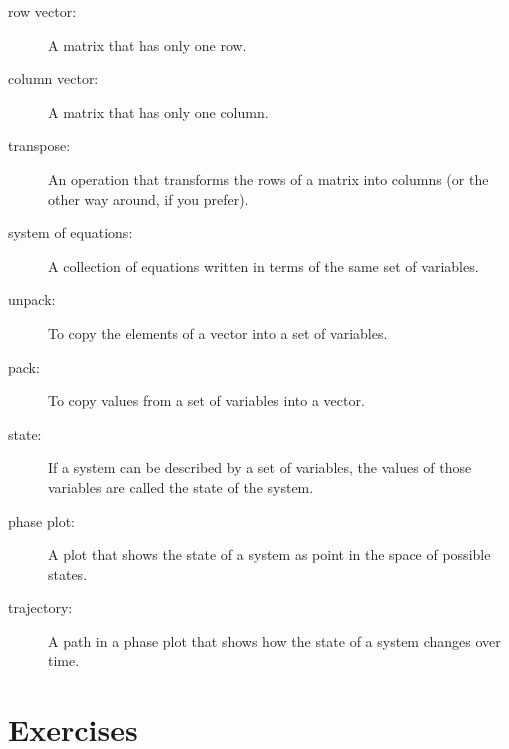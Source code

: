 \begin{description}

\item[row vector:] A matrix that has only one row.

\item[column vector:] A matrix that has only one column.

\item[transpose:] An operation that transforms the rows of a matrix
into columns (or the other way around, if you prefer).

\item[system of equations:] A collection of equations written in terms of
the same set of variables.

\item[unpack:] To copy the elements of a vector into a set of variables.

\item[pack:] To copy values from a set of variables into a vector.

\item[state:] If a system can be described by a set of variables,
the values of those variables are called the state of the system.

\item[phase plot:] A plot that shows the state of a system as point
in the space of possible states.

\item[trajectory:] A path in a phase plot that shows how the state of
a system changes over time.


\end{description}

\section{Exercises}

